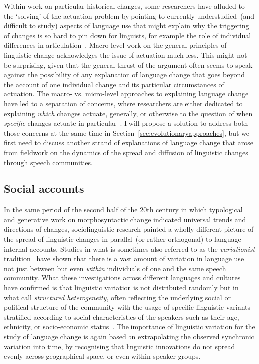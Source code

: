 Within work on particular historical changes, some researchers have alluded to the `solving' of the actuation problem by pointing to currently understudied~(and difficult to study) aspects of language use that might explain why the triggering of changes is so hard to pin down for linguists, for example the role of individual differences in articulation~\citep{Baker2011,Stevens2013}.
Macro-level work on the general principles of linguistic change acknowledges the issue of actuation much less. This might not be surprising, given that the general thrust of the argument often seems to speak against the possibility of any explanation of language change that goes beyond the account of one individual change and its particular circumstances of actuation.
The macro- vs. micro-level approaches to explaining language change have led to a separation of concerns, where researchers are either dedicated to explaining \emph{which} changes actuate, generally, or otherwise to the question of when \emph{specific} changes actuate in particular~\citep{Bynon1977}. I will propose a solution to address both those concerns at the same time in Section~\ref{sec:evolutionaryapproaches}, but we first need to discuss another strand of explanations of language change that arose from fieldwork on the dynamics of the spread and diffusion of linguistic changes through speech communities.

\subsection{Social accounts}
\label{sec:socialaccounts}

In the same period of the second half of the 20th century in which typological and generative work on morphosyntactic change indicated universal trends and directions of changes, sociolinguistic research %
painted a wholly different picture of the spread of linguistic changes in parallel~(or rather orthogonal) to language-internal accounts.
Studies in what is sometimes also referred to as the \emph{variationist} tradition~\citep{Tagliamonte2015} have shown that there is a vast amount of variation in language use not just between but even \emph{within} individuals of one and the same speech community.
What these investigations across different languages and cultures have confirmed is that linguistic variation is not distributed randomly but in what \citet{Weinreich1968} call \emph{structured heterogeneity}, often reflecting the underlying social or political structure of the community with the usage of specific linguistic variants stratified according to social characteristics of the speakers such as their age, ethnicity, or socio-economic status~\citep{Foulkes2006,Tagliamonte2012}.
The importance of linguistic variation for the study of language change is again based on extrapolating the observed synchronic variation into time, by recognising that linguistic innovations do not spread evenly across geographical space, or even within speaker groups.

